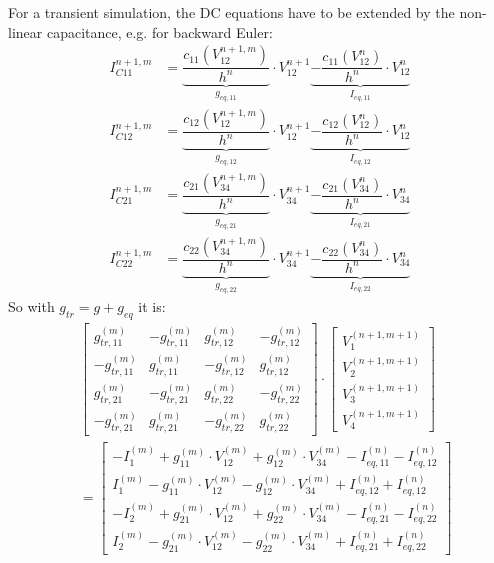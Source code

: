For a transient simulation, the DC equations have to be extended
by the non-linear capacitance, e.g. for backward Euler:
\begin{align}
I_{C11}^{n+1,m} &=
   \underbrace{\dfrac{c_{11}(V_{12}^{n+1,m})}{h^n}}_{g_{eq,11}}\cdot V_{12}^{n+1}
   \underbrace{- \dfrac{c_{11}(V_{12}^{n})}{h^n}\cdot V_{12}^{n}}_{I_{eq,11}}\\
I_{C12}^{n+1,m} &=
   \underbrace{\dfrac{c_{12}(V_{12}^{n+1,m})}{h^n}}_{g_{eq,12}}\cdot V_{12}^{n+1}
   \underbrace{- \dfrac{c_{12}(V_{12}^{n})}{h^n}\cdot V_{12}^{n}}_{I_{eq,12}}\\
I_{C21}^{n+1,m} &=
   \underbrace{\dfrac{c_{21}(V_{34}^{n+1,m})}{h^n}}_{g_{eq,21}}\cdot V_{34}^{n+1}
   \underbrace{- \dfrac{c_{21}(V_{34}^{n})}{h^n}\cdot V_{34}^{n}}_{I_{eq,21}}\\
I_{C22}^{n+1,m} &=
   \underbrace{\dfrac{c_{22}(V_{34}^{n+1,m})}{h^n}}_{g_{eq,22}}\cdot V_{34}^{n+1}
   \underbrace{- \dfrac{c_{22}(V_{34}^{n})}{h^n}\cdot V_{34}^{n}}_{I_{eq,22}}
\end{align}
So with $g_{tr} = g + g_{eq}$ it is:
\begin{align}
&
\begin{bmatrix}
 g_{tr,11}^{(m)} & -g_{tr,11}^{(m)} &  g_{tr,12}^{(m)} & -g_{tr,12}^{(m)}\\
-g_{tr,11}^{(m)} &  g_{tr,11}^{(m)} & -g_{tr,12}^{(m)} &  g_{tr,12}^{(m)}\\
 g_{tr,21}^{(m)} & -g_{tr,21}^{(m)} &  g_{tr,22}^{(m)} & -g_{tr,22}^{(m)}\\
-g_{tr,21}^{(m)} &  g_{tr,21}^{(m)} & -g_{tr,22}^{(m)} &  g_{tr,22}^{(m)}
\end{bmatrix}
\cdot
\begin{bmatrix}
V_{1}^{(n+1,m+1)}\\
V_{2}^{(n+1,m+1)}\\
V_{3}^{(n+1,m+1)}\\
V_{4}^{(n+1,m+1)}
\end{bmatrix} \\
&=
\begin{bmatrix}
-I_1^{(m)} + g_{11}^{(m)}\cdot V_{12}^{(m)} + g_{12}^{(m)}\cdot V_{34}^{(m)} - I_{eq,11}^{(n)} - I_{eq,12}^{(n)}\\
 I_1^{(m)} - g_{11}^{(m)}\cdot V_{12}^{(m)} - g_{12}^{(m)}\cdot V_{34}^{(m)} + I_{eq,12}^{(n)} + I_{eq,12}^{(n)}\\
-I_2^{(m)} + g_{21}^{(m)}\cdot V_{12}^{(m)} + g_{22}^{(m)}\cdot V_{34}^{(m)} - I_{eq,21}^{(n)} - I_{eq,22}^{(n)}\\
 I_2^{(m)} - g_{21}^{(m)}\cdot V_{12}^{(m)} - g_{22}^{(m)}\cdot V_{34}^{(m)} + I_{eq,21}^{(n)} + I_{eq,22}^{(n)}
\end{bmatrix}
\end{align}


